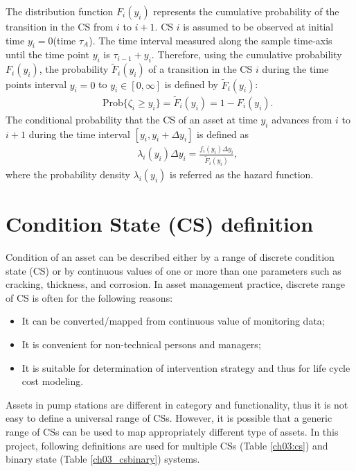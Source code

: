 The distribution function $F_i(y_i)$ represents the cumulative probability of the transition in the CS from $i$ to $i+1$. CS $i$ is assumed to be observed at initial time $y_i=0$(time $\tau_A$). The time interval measured along the sample time-axis until the time point $y_i$ is $\tau_{i-1}+y_i$. Therefore, using the cumulative probability $F_i(y_i)$, the probability $\tilde{F}_i(y_i)$ of a transition in the CS $i$ during the time points interval $y_i=0$ to $y_i\in [0,\infty]$ is defined by $\tilde{F}_i(y_i)$:
\begin{eqnarray}
&& \mbox{Prob}\{\zeta_i \geq y_i\}= \tilde{F}_i(y_i) = 1 -  F_i(y_i). \label{funcbF}
\end{eqnarray}
The conditional probability that the CS of an asset at time $y_i$ advances from $i$ to $i+1$ during the time interval $[y_i,y_i+\Delta y_i]$ is defined as
\begin{eqnarray}
&& \lambda_i(y_i) \Delta y_i = \frac{f_i(y_i)\Delta y_i}{\tilde{F}_i(y_i)}  \label{riskbF},
\end{eqnarray}
where the probability density $\lambda_i(y_i)$ is referred as the hazard function.


\section{Condition State (CS) definition}
\label{csdefinition}
Condition of an asset can be described either by a range of discrete condition state (CS) or by continuous values of one or more than one parameters such as cracking, thickness, and corrosion. In asset management practice, discrete range of CS is often for the following reasons:

\begin{itemize}
	\item It can be converted/mapped from continuous value of monitoring data;
	\item It is convenient for non-technical persons and managers;
	\item It is suitable for determination of intervention strategy and thus for life cycle cost modeling.
\end{itemize}

Assets in pump stations are different in category and functionality, thus it is not easy to define a universal range of CSs. However, it is possible that a generic range of CSs can be used to map appropriately different type of assets. In this project, following definitions are used for multiple CSs (Table \ref{ch03:cs}) and binary state (Table \ref{ch03_csbinary}) systems.


